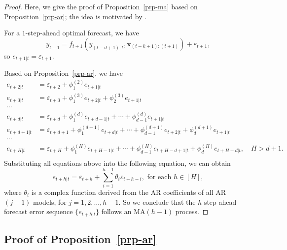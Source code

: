 \documentclass[
  11pt,
  a4paper,
]{article}
\theoremstyle{plain}
\theoremstyle{remark}
\begin{document}
\begin{proof}
Here, we give the proof of Proposition~\ref{prp-ma} based on
Proposition~\ref{prp-ar}; the idea is motivated by
\textcite{sommer2023}.

For a \(1\)-step-ahead optimal forecast, we have \[
y_{t+1} = f_{t+1}(y_{(t-d+1):t},\bm{x}_{(t-k+1):(t+1)}) + \varepsilon_{t+1},
\] so \(e_{t+1|t}=\varepsilon_{t+1}\).

Based on Proposition~\ref{prp-ar}, we have \begin{align*}
e_{t+2|t} &= \varepsilon_{t+2} + \phi_{1}^{(2)}e_{t+1|t} \\
e_{t+3|t} &= \varepsilon_{t+3} + \phi_{1}^{(3)}e_{t+2|t} + \phi_{2}^{(3)}e_{t+1|t} \\
\cdots \\
e_{t+d|t} &= \varepsilon_{t+d} + \phi_{1}^{(d)}e_{t+d-1|t} + \cdots + \phi_{d-1}^{(d)}e_{t+1|t} \\
e_{t+d+1|t} &= \varepsilon_{t+d+1} + \phi_{1}^{(d+1)}e_{t+d|t} + \cdots + \phi_{d-1}^{(d+1)}e_{t+2|t} + \phi_{d}^{(d+1)}e_{t+1|t} \\
\cdots \\
e_{t+H|t} &= \varepsilon_{t+H} + \phi_{1}^{(H)}e_{t+H-1|t} + \cdots + \phi_{d-1}^{(H)}e_{t+H-d+1|t} + \phi_{d}^{(H)}e_{t+H-d|t}, \quad H > d + 1. \\
\end{align*}  Substituting all
equations above into the following equation, we can obtain \[
e_{t+h|t} = \varepsilon_{t+h} + \sum_{i=1}^{h-1}\theta_{i}\varepsilon_{t+h-i}, \text{ for each } h\in[H],
\] where \(\theta_{i}\) is a complex function derived from the AR
coefficients of all AR\((j-1)\) models, for
\(j = 1,2,\ldots,h-1\). So we conclude that the \(h\)-step-ahead
forecast error sequence \(\{e_{t+h|t}\}\) follows an MA\((h-1)\)
process.
\end{proof}

\subsection{\texorpdfstring{Proof of
Proposition~\ref{prp-ar}}{Proof of Proposition~}}\label{sec-proof_ar}
\end{document}
